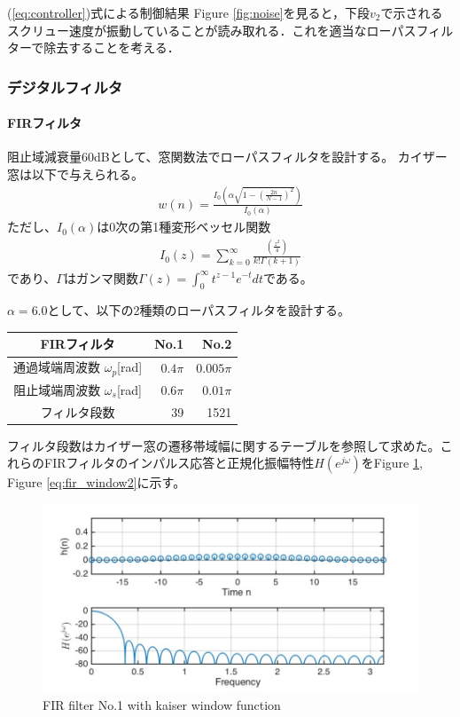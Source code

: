 \documentclass[twocolumn,oneside,a4paper]{article}
\begin{document}
(\ref{eq:controller})式による制御結果
Figure \ref{fig:noise}を見ると，下段$v_2$で示されるスクリュー速度が振動していることが読み取れる．これを適当なローパスフィルターで除去することを考える．

\subsubsection{デジタルフィルタ}
\paragraph{FIRフィルタ}
阻止域減衰量60dBとして、窓関数法でローパスフィルタを設計する。
カイザー窓は以下で与えられる。
\begin{eqnarray*}
	w(n) = \frac{I_0 \left( \alpha \sqrt{1-\left(\frac{2n}{N-1}\right)^2} \right) }{I_0(\alpha)}	
\end{eqnarray*}
ただし、$I_0({\alpha})$は0次の第1種変形ベッセル関数
\begin{eqnarray*}
 I_0(z)	= \sum_{k=0}^{\infty}\frac{\left(\frac{z^2}{4}\right)}{k!\Gamma (k+1)}
\end{eqnarray*}
であり、$\Gamma$はガンマ関数$\Gamma(z) = \int_0^{\infty} t^{z-1}e^{-t} dt$である。

$\alpha = 6.0$として、以下の2種類のローパスフィルタを設計する。

\begin{tabular}{crr}
\toprule
FIRフィルタ  & No.1 & No.2 \\
\midrule
通過域端周波数 $\omega_p$[rad] & $0.4 \pi$ & $0.005 \pi$ \\
阻止域端周波数 $\omega_s$[rad] & $0.6 \pi$ & $0.01 \pi$ \\
フィルタ段数 & 39 & 1521 \\
\bottomrule
\end{tabular}


フィルタ段数はカイザー窓の遷移帯域幅に関するテーブルを参照して求めた。これらのFIRフィルタのインパルス応答と正規化振幅特性$H(e^{j \omega})$をFigure \ref{eq:fir_window}, Figure \ref{eq:fir_window2}に示す。


\begin{figure}[htbp]
    \includegraphics[bb=0 0 432 216,width=1\columnwidth]{impulse_h.pdf}
    \caption{FIR filter No.1 with kaiser window function}
   \label{eq:fir_window}
\end{figure}
\end{document}
